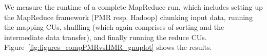\documentclass{acm_proc_article-sp}
\newcommand{\alnote}[1]{ {\textcolor{blue} { ***andreL: #1 }}}
\newcommand{\pnote}[1]{ {\textcolor{magenta} { ***pradeep: #1 }}}
\newcommand{\alnote}[1]{}
\newcommand{\pnote}[1]{}
\begin{document}


We measure the runtime of a complete MapReduce run, which includes setting up 
the MapReduce framework (PMR resp. Hadoop) chunking
input data, running the mapping CUs, shuffling (which again comprises of sorting
and the intermediate data transfer), and finally running the reduce CUs.
Figure~\ref{fig:figures_compPMRvsHMR_gnuplot} shows the results.


\end{document}
